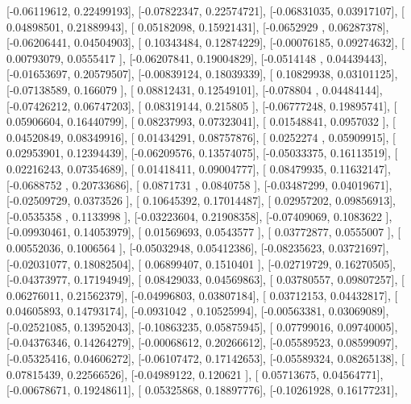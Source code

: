 \documentclass{article}
\begin{document}
       [-0.06119612,  0.22499193],
       [-0.07822347,  0.22574721],
       [-0.06831035,  0.03917107],
       [ 0.04898501,  0.21889943],
       [ 0.05182098,  0.15921431],
       [-0.0652929 ,  0.06287378],
       [-0.06206441,  0.04504903],
       [ 0.10343484,  0.12874229],
       [-0.00076185,  0.09274632],
       [ 0.00793079,  0.0555417 ],
       [-0.06207841,  0.19004829],
       [-0.0514148 ,  0.04439443],
       [-0.01653697,  0.20579507],
       [-0.00839124,  0.18039339],
       [ 0.10829938,  0.03101125],
       [-0.07138589,  0.166079  ],
       [ 0.08812431,  0.12549101],
       [-0.078804  ,  0.04484144],
       [-0.07426212,  0.06747203],
       [ 0.08319144,  0.215805  ],
       [-0.06777248,  0.19895741],
       [ 0.05906604,  0.16440799],
       [ 0.08237993,  0.07323041],
       [ 0.01548841,  0.0957032 ],
       [ 0.04520849,  0.08349916],
       [ 0.01434291,  0.08757876],
       [ 0.0252274 ,  0.05909915],
       [ 0.02953901,  0.12394439],
       [-0.06209576,  0.13574075],
       [-0.05033375,  0.16113519],
       [ 0.02216243,  0.07354689],
       [ 0.01418411,  0.09004777],
       [ 0.08479935,  0.11632147],
       [-0.0688752 ,  0.20733686],
       [ 0.0871731 ,  0.0840758 ],
       [-0.03487299,  0.04019671],
       [-0.02509729,  0.0373526 ],
       [ 0.10645392,  0.17014487],
       [ 0.02957202,  0.09856913],
       [-0.0535358 ,  0.1133998 ],
       [-0.03223604,  0.21908358],
       [-0.07409069,  0.1083622 ],
       [-0.09930461,  0.14053979],
       [ 0.01569693,  0.0543577 ],
       [ 0.03772877,  0.0555007 ],
       [ 0.00552036,  0.1006564 ],
       [-0.05032948,  0.05412386],
       [-0.08235623,  0.03721697],
       [-0.02031077,  0.18082504],
       [ 0.06899407,  0.1510401 ],
       [-0.02719729,  0.16270505],
       [-0.04373977,  0.17194949],
       [ 0.08429033,  0.04569863],
       [ 0.03780557,  0.09807257],
       [ 0.06276011,  0.21562379],
       [-0.04996803,  0.03807184],
       [ 0.03712153,  0.04432817],
       [ 0.04605893,  0.14793174],
       [-0.0931042 ,  0.10525994],
       [-0.00563381,  0.03069089],
       [-0.02521085,  0.13952043],
       [-0.10863235,  0.05875945],
       [ 0.07799016,  0.09740005],
       [-0.04376346,  0.14264279],
       [-0.00068612,  0.20266612],
       [-0.05589523,  0.08599097],
       [-0.05325416,  0.04606272],
       [-0.06107472,  0.17142653],
       [-0.05589324,  0.08265138],
       [ 0.07815439,  0.22566526],
       [-0.04989122,  0.120621  ],
       [ 0.05713675,  0.04564771],
       [-0.00678671,  0.19248611],
       [ 0.05325868,  0.18897776],
       [-0.10261928,  0.16177231],
\end{document}
